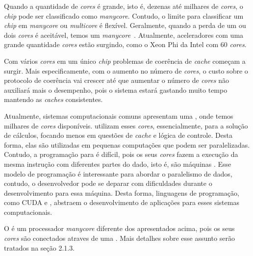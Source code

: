 Quando a quantidade de \textit{cores} é grande, isto é, dezenas até milhares de
\textit{cores}, o \textit{chip} pode ser classificado como \textit{manycore}.
Contudo, o limite para classificar um \textit{chip} em \textit{manycore} ou
\textit{multicore} é flexível. Geralmente, quando a perda de um ou dois
\textit{cores} é aceitável, temos um \textit{manycore}~\cite{Tanenbaum2015}.
Atualmente, aceleradores com uma grande quantidade \textit{cores} estão
surgindo, como o Xeon Phi da Intel com 60 \textit{cores}.

Com vários \textit{cores} em um único \textit{chip} problemas de coerência de
\textit{cache} começam a surgir. Mais especificamente, com o aumento no número
de \textit{cores}, o custo sobre o protocolo de coerência vai crescer até que
aumentar o número de \textit{cores} não auxiliará mais o desempenho, pois o sistema
estará gastando muito tempo mantendo as \textit{caches} consistentes.


Atualmente, sistemas computacionais comuns apresentam uma \gpu, onde temos
milhares de \textit{cores} disponíveis. \gpus utilizam esses \textit{cores},
essencialmente, para a solução de cálculos, focando menos em questões de
\textit{cache} e lógica de controle. Desta forma, elas são utilizadas em
pequenas computações que podem ser paralelizadas. Contudo, a programação para
\gpus é difícil, pois os seus \textit{cores} fazem a execução da mesma instrução
com diferentes partes do dado, isto é, são máquinas \simd. Esse modelo de
programação é interessante para abordar o paralelismo de dados, contudo, o
desenvolvedor pode se deparar com dificuldades durante o desenvolvimento para
essa máquina. Desta forma, linguagens de programação, como CUDA e \opengl,
abstraem o desenvolvimento de aplicações para esses sistemas computacionais.

O \mppa é um processador \textit{manycore} diferente dos apresentados acima,
pois os seus \textit{cores} são conectados atraves de uma \noc. Mais detalhes
sobre esse assunto serão tratados na seção 2.1.3.

